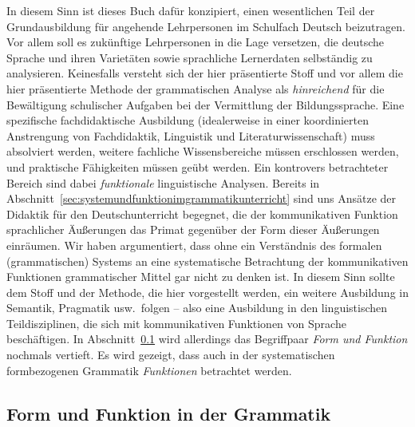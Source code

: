 In diesem Sinn ist dieses Buch dafür konzipiert, einen wesentlichen Teil der Grundausbildung für angehende Lehrpersonen im Schulfach Deutsch beizutragen.
Vor allem soll es zukünftige Lehrpersonen in die Lage versetzen, die deutsche Sprache und ihren Varietäten sowie sprachliche Lernerdaten selbständig zu analysieren.
Keinesfalls versteht sich der hier präsentierte Stoff und vor allem die hier präsentierte Methode der grammatischen Analyse als \textit{hinreichend} für die Bewältigung schulischer Aufgaben bei der Vermittlung der Bildungssprache.
Eine spezifische fachdidaktische Ausbildung (idealerweise in einer koordinierten Anstrengung von Fachdidaktik, Linguistik und Literaturwissenschaft) muss absolviert werden, weitere fachliche Wissensbereiche müssen erschlossen werden, und praktische Fähigkeiten müssen geübt werden.
Ein kontrovers betrachteter Bereich sind dabei \textit{funktionale} linguistische Analysen.
Bereits in Abschnitt~\ref{sec:systemundfunktionimgrammatikunterricht} sind uns Ansätze der Didaktik für den Deutschunterricht begegnet, die der kommunikativen Funktion sprachlicher Äußerungen das Primat gegenüber der Form dieser Äußerungen einräumen.
Wir haben argumentiert, dass ohne ein Verständnis des formalen (grammatischen) Systems an eine systematische Betrachtung der kommunikativen Funktionen grammatischer Mittel gar nicht zu denken ist.
In diesem Sinn sollte dem Stoff und der Methode, die hier vorgestellt werden, ein weitere Ausbildung in Semantik, Pragmatik usw.\ folgen -- also eine Ausbildung in den linguistischen Teildisziplinen, die sich mit kommunikativen Funktionen von Sprache beschäftigen.
In Abschnitt~\ref{sec:formundfunktionindergrammatik} wird allerdings das Begriffpaar \textit{Form und Funktion} nochmals vertieft.
Es wird gezeigt, dass auch in der systematischen formbezogenen Grammatik \textit{Funktionen} betrachtet werden.


\subsection{Form und Funktion in der Grammatik}
\label{sec:formundfunktionindergrammatik}

